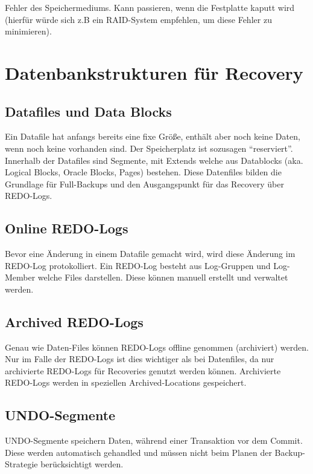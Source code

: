 Fehler des Speichermediums. Kann passieren, wenn die Festplatte kaputt wird (hierfür würde sich z.B ein RAID-System empfehlen, um diese Fehler zu minimieren).

\section{Datenbankstrukturen für Recovery}

\subsection{Datafiles und Data Blocks}

Ein Datafile hat anfangs bereits eine fixe Größe, enthält aber noch keine Daten, wenn noch keine vorhanden sind. Der Speicherplatz ist sozusagen “reserviert”. Innerhalb der Datafiles sind Segmente, mit Extends welche aus Datablocks (aka. Logical Blocks, Oracle Blocks, Pages) bestehen. Diese Datenfiles bilden die Grundlage für Full-Backups und den Ausgangspunkt für das Recovery über REDO-Logs.

\subsection{Online REDO-Logs}

Bevor eine Änderung in einem Datafile gemacht wird, wird diese Änderung im REDO-Log protokolliert. Ein REDO-Log besteht aus Log-Gruppen und Log-Member welche Files darstellen. Diese können manuell erstellt und verwaltet werden.

\subsection{Archived REDO-Logs}

Genau wie Daten-Files können REDO-Logs offline genommen (archiviert) werden. Nur im Falle der REDO-Logs ist dies wichtiger als bei Datenfiles, da nur archivierte REDO-Logs für Recoveries genutzt werden können. Archivierte REDO-Logs werden in speziellen Archived-Locations gespeichert.

\subsection{UNDO-Segmente}

UNDO-Segmente speichern Daten, während einer Transaktion vor dem Commit. Diese werden automatisch gehandled und müssen nicht beim Planen der Backup-Strategie berücksichtigt werden.

